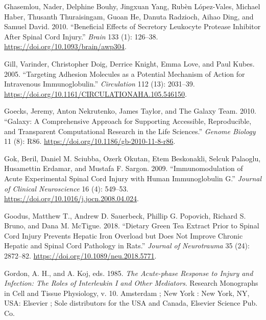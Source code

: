 \documentclass[9pt,lineno]{elife}
\newlength{\cslhangindent}
\newlength{\cslentryspacingunit} %
\newenvironment{CSLReferences}[2] %
 {%
  \setlength{\parindent}{0pt}
  \ifodd #1
  \let\oldpar\par
  \def\par{\hangindent=\cslhangindent\oldpar}
  \fi
  \setlength{\parskip}{#2\cslentryspacingunit}
 }%
 {}
\begin{document}
\begin{CSLReferences}{1}{0}
\leavevmode{}%
Ghasemlou, Nader, Delphine Bouhy, Jingxuan Yang, Rubèn López-Vales, Michael Haber, Thusanth Thuraisingam, Guoan He, Danuta Radzioch, Aihao Ding, and Samuel David. 2010. {``Beneficial Effects of Secretory Leukocyte Protease Inhibitor After Spinal Cord Injury.''} \emph{Brain} 133 (1): 126--38. \url{https://doi.org/10.1093/brain/awp304}.

\leavevmode{}%
Gill, Varinder, Christopher Doig, Derrice Knight, Emma Love, and Paul Kubes. 2005. {``Targeting {Adhesion Molecules} as a {Potential Mechanism} of {Action} for {Intravenous Immunoglobulin}.''} \emph{Circulation} 112 (13): 2031--39. \url{https://doi.org/10.1161/CIRCULATIONAHA.105.546150}.

\leavevmode{}%
Goecks, Jeremy, Anton Nekrutenko, James Taylor, and The Galaxy Team. 2010. {``Galaxy: A Comprehensive Approach for Supporting Accessible, Reproducible, and Transparent Computational Research in the Life Sciences.''} \emph{Genome Biology} 11 (8): R86. \url{https://doi.org/10.1186/gb-2010-11-8-r86}.

\leavevmode{}%
Gok, Beril, Daniel M. Sciubba, Ozerk Okutan, Etem Beskonakli, Selcuk Palaoglu, Husamettin Erdamar, and Mustafa F. Sargon. 2009. {``Immunomodulation of Acute Experimental Spinal Cord Injury with Human Immunoglobulin {G}.''} \emph{Journal of Clinical Neuroscience} 16 (4): 549--53. \url{https://doi.org/10.1016/j.jocn.2008.04.024}.

\leavevmode{}%
Goodus, Matthew T., Andrew D. Sauerbeck, Phillip G. Popovich, Richard S. Bruno, and Dana M. McTigue. 2018. {``Dietary Green Tea Extract Prior to Spinal Cord Injury Prevents Hepatic Iron Overload but Does Not Improve Chronic Hepatic and Spinal Cord Pathology in Rats.''} \emph{Journal of Neurotrauma} 35 (24): 2872--82. \url{https://doi.org/10.1089/neu.2018.5771}.

\leavevmode{}%
Gordon, A. H., and A. Koj, eds. 1985. \emph{The {Acute-phase} Response to Injury and Infection: The Roles of Interleukin {I} and Other Mediators}. Research Monographs in Cell and Tissue Physiology, v. 10. {Amsterdam ; New York : New York, NY, USA}: {Elsevier ; Sole distributors for the USA and Canada, Elsevier Science Pub. Co}.


\end{CSLReferences}
\end{document}
